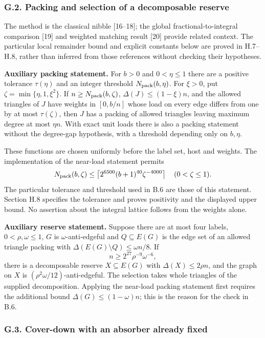 \documentclass[english,11pt,a4paper]{article}
\begin{document}
\subsubsection{G.2. Packing and selection of a decomposable reserve}\label{g.2.-packing-and-selection-of-a-decomposable-reserve}

The method is the classical nibble {[}16--18{]}; the global fractional-to-integral comparison {[}19{]} and weighted matching result {[}20{]} provide related context. The particular local remainder bound and explicit constants below are proved in H.7--H.8, rather than inferred from those references without checking their hypotheses.

\textbf{Auxiliary packing statement.} For \(b>0\) and \(0<\eta\le1\) there are a positive tolerance \(\tau(\eta)\) and an integer threshold \(N_{\rm pack}(b,\eta)\). For \(\xi>0\), put \(\zeta=\min\{\eta,1,\xi^2\}\). If \(n\ge N_{\rm pack}(b,\zeta)\), \(\Delta(J)\le(1-\xi)n\), and the allowed triangles of \(J\) have weights in \([0,b/n]\) whose load on every edge differs from one by at most \(\tau(\zeta)\), then \(J\) has a packing of allowed triangles leaving maximum degree at most \(\eta n\). With exact unit loads there is also a packing statement without the degree-gap hypothesis, with a threshold depending only on \(b,\eta\).

These functions are chosen uniformly before the label set, host and weights. The implementation of the near-load statement permits \[N_{\rm pack}(b,\zeta)\le
\left\lceil2^{6500}(b+1)^{40}\zeta^{-4000}\right\rceil
\quad(0<\zeta\le1).\] The particular tolerance and threshold used in B.6 are those of this statement. Section H.8 specifies the tolerance and proves positivity and the displayed upper bound. No assertion about the integral lattice follows from the weights alone.

\textbf{Auxiliary reserve statement.} Suppose there are at most four labels, \(0<\rho,\omega\le1\), \(G\) is \(\omega\)-anti-edgeful and \(Q\subseteq E(G)\) is the edge set of an allowed triangle packing with \(\Delta(E(G)\setminus Q)\le\omega n/8\). If \[n\ge2^{27}\rho^{-9}\omega^{-6},\] there is a decomposable reserve \(X\subseteq E(G)\) with \(\Delta(X)\le2\rho n\), and the graph on \(X\) is \((\rho^2\omega/12)\)-anti-edgeful. The selection takes whole triangles of the supplied decomposition. Applying the near-load packing statement first requires the additional bound \(\Delta(G)\le(1-\omega)n\); this is the reason for the check in B.6.

\subsubsection{G.3. Cover-down with an absorber already fixed}\label{g.3.-cover-down-with-an-absorber-already-fixed}
\end{document}
